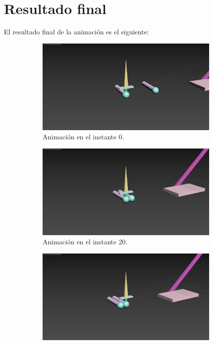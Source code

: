 \section{Resultado final}

El resultado final de la animación es el siguiente:


\begin{figure}[H]
    \centering
    \begin{subfigure}[t]{0.48\textwidth}
        \centering
        \includegraphics[width=\textwidth]{imagenes/resultado/0.png}
        \caption{Animación en el instante 0.}
    \end{subfigure}
    \hfill
    \begin{subfigure}[t]{0.48\textwidth}
        \centering
        \includegraphics[width=\textwidth]{imagenes/resultado/20.png}
        \caption{Animación en el instante 20.}
    \end{subfigure}
    \hfill
    \begin{subfigure}[t]{0.48\textwidth}
        \centering
        \includegraphics[width=\textwidth]{imagenes/resultado/27y30.png}

\end{subfigure}
\end{figure}
